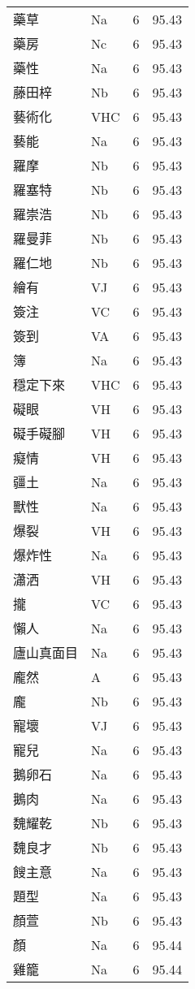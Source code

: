\documentclass[twocolumn]{book}
\begin{document}
\begin{supertabular}{llrr}
藥草 & Na & 6 &  95.43\\
藥房 & Nc & 6 &  95.43\\
藥性 & Na & 6 &  95.43\\
藤田梓 & Nb & 6 &  95.43\\
藝術化 & VHC & 6 &  95.43\\
藝能 & Na & 6 &  95.43\\
羅摩 & Nb & 6 &  95.43\\
羅塞特 & Nb & 6 &  95.43\\
羅崇浩 & Nb & 6 &  95.43\\
羅曼菲 & Nb & 6 &  95.43\\
羅仁地 & Nb & 6 &  95.43\\
繪有 & VJ & 6 &  95.43\\
簽注 & VC & 6 &  95.43\\
簽到 & VA & 6 &  95.43\\
簿 & Na & 6 &  95.43\\
穩定下來 & VHC & 6 &  95.43\\
礙眼 & VH & 6 &  95.43\\
礙手礙腳 & VH & 6 &  95.43\\
癡情 & VH & 6 &  95.43\\
疆土 & Na & 6 &  95.43\\
獸性 & Na & 6 &  95.43\\
爆裂 & VH & 6 &  95.43\\
爆炸性 & Na & 6 &  95.43\\
瀟洒 & VH & 6 &  95.43\\
攏 & VC & 6 &  95.43\\
懶人 & Na & 6 &  95.43\\
廬山真面目 & Na & 6 &  95.43\\
龐然 & A & 6 &  95.43\\
龐 & Nb & 6 &  95.43\\
寵壞 & VJ & 6 &  95.43\\
寵兒 & Na & 6 &  95.43\\
鵝卵石 & Na & 6 &  95.43\\
鵝肉 & Na & 6 &  95.43\\
魏耀乾 & Nb & 6 &  95.43\\
魏良才 & Nb & 6 &  95.43\\
餿主意 & Na & 6 &  95.43\\
題型 & Na & 6 &  95.43\\
顏萱 & Nb & 6 &  95.43\\
顏 & Na & 6 &  95.44\\
雞籠 & Na & 6 &  95.44\\

\end{supertabular}
\end{document}
